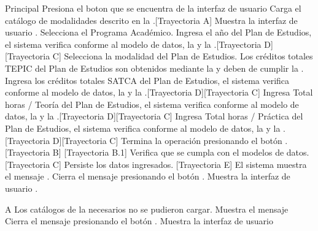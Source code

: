 \begin{UCtrayectoria}{Principal}
	\UCpaso[\UCactor] Presiona el boton \IUbutton{+} que se encuentra de la interfaz de usuario 
	\UCpaso Carga el catálogo de modalidades descrito en la .[Trayectoria A]
	\UCpaso Muestra la interfaz de usuario .
	\UCpaso[\UCactor] Selecciona el Programa Académico.
	\UCpaso[\UCactor] Ingresa el año del Plan de Estudios, el sistema verifica conforme al modelo de datos, la  y la .[Trayectoria D][Trayectoria C]
	\UCpaso[\UCactor] Selecciona la modalidad del Plan de Estudios.
	\UCpaso[\UCactor] Los créditos totales TEPIC del Plan de Estudios son obtenidos mediante la  y deben de cumplir la .
	\UCpaso[\UCactor] Ingresa los créditos totales SATCA del Plan de Estudios, el sistema verifica conforme al modelo de datos, la  y la .[Trayectoria D][Trayectoria C]
	\UCpaso[\UCactor] Ingresa Total horas / Teoría del Plan de Estudios, el sistema verifica conforme al modelo de datos, la  y la .[Trayectoria D][Trayectoria C]
	\UCpaso[\UCactor] Ingresa Total horas / Práctica del Plan de Estudios, el sistema verifica conforme al modelo de datos, la  y la .[Trayectoria D][Trayectoria C]
	\UCpaso[\UCactor] Termina la operación presionando el botón . [Trayectoria B] [Trayectoria B.1]
	\UCpaso Verifica que se cumpla con el modelos de datos. [Trayectoria C] 
	\UCpaso Persiste los datos ingresados. [Trayectoria E]
	\UCpaso El sistema muestra el mensaje .
	\UCpaso[\UCactor] Cierra el mensaje presionando el botón .
	\UCpaso Muestra la interfaz de usuario .
\end{UCtrayectoria}
\begin{UCtrayectoriaA}{A}{ Los catálogos de la  necesarios no se pudieron cargar.}
	\UCpaso Muestra el mensaje 
	\UCpaso[\UCactor] Cierra el mensaje presionando el botón .
	\UCpaso Muestra la interfaz de usuario 
\end{UCtrayectoriaA}

